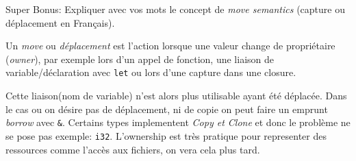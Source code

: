 \documentclass[11pt,a4paper,addpoint]{exam}
\begin{document}
\begin{questions}
\question[1] Super Bonus: Expliquer avec vos mots le concept de \emph{move semantics} (capture ou déplacement en Français).
\ifprintanswers
\begin{solution}
Un \emph{move} ou \emph{déplacement} est l'action lorsque une valeur change de propriétaire (\emph{owner}),
par exemple lors d'un appel de fonction, une liaison de variable/déclaration avec \texttt{let} ou lors d'une capture dans une closure.

Cette liaison(nom de variable) n'est alors plus utilisable ayant été déplacée. Dans le cas ou on désire pas
de déplacement, ni de copie on peut faire un emprunt \emph{borrow} avec \texttt{&}.
Certains types implementent \emph{Copy et Clone} et donc le problème ne se pose pas exemple: \texttt{i32}.
L'ownership est très pratique pour representer des ressources comme l'accès aux fichiers, on vera cela plus tard.
\end{solution}
\else
\vspace{2in}
\fi


  \end{questions}
\end{document}
